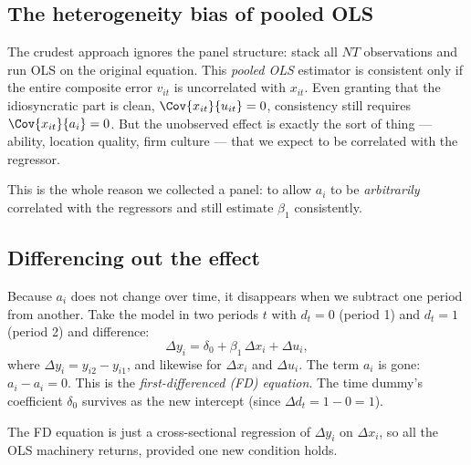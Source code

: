\subsection{The heterogeneity bias of pooled OLS}

The crudest approach ignores the panel structure: stack all $NT$ observations and run OLS on the original equation. This \emph{pooled OLS} estimator is consistent only if the entire composite error $v_{it}$ is uncorrelated with $x_{it}$. Even granting that the idiosyncratic part is clean, $\Cov{x_{it}}{u_{it}}=0$, consistency still requires $\Cov{x_{it}}{a_i}=0$. But the unobserved effect is exactly the sort of thing --- ability, location quality, firm culture --- that we expect to be correlated with the regressor.


This is the whole reason we collected a panel: to allow $a_i$ to be \emph{arbitrarily} correlated with the regressors and still estimate $\beta_1$ consistently.

\subsection{Differencing out the effect}

Because $a_i$ does not change over time, it disappears when we subtract one period from another. Take the model in two periods $t$ with $d_t=0$ (period 1) and $d_t=1$ (period 2) and difference:
\[
\Delta y_i = \delta_0 + \beta_1\,\Delta x_i + \Delta u_i,
\]
where $\Delta y_i = y_{i2}-y_{i1}$, and likewise for $\Delta x_i$ and $\Delta u_i$. The term $a_i$ is gone: $a_i - a_i = 0$. This is the \emph{first-differenced (FD) equation}. The time dummy's coefficient $\delta_0$ survives as the new intercept (since $\Delta d_t = 1-0 = 1$).

The FD equation is just a cross-sectional regression of $\Delta y_i$ on $\Delta x_i$, so all the OLS machinery returns, provided one new condition holds.


